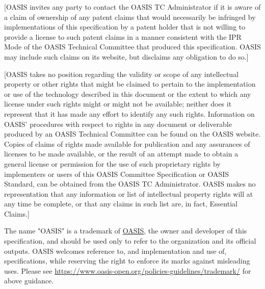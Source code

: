 \begin{titlepage}

[OASIS invites any party to contact the OASIS TC Administrator if it is
aware of a claim of ownership of any patent claims that would
necessarily be infringed by implementations of this specification by a
patent holder that is not willing to provide a license to such patent
claims in a manner consistent with the IPR Mode of the OASIS Technical
Committee that produced this specification. OASIS may include such
claims on its website, but disclaims any obligation to do so.]

[OASIS takes no position regarding the validity or scope of any
intellectual property or other rights that might be claimed to pertain
to the implementation or use of the technology described in this
document or the extent to which any license under such rights might or
might not be available; neither does it represent that it has made any
effort to identify any such rights. Information on OASIS' procedures
with respect to rights in any document or deliverable produced by an
OASIS Technical Committee can be found on the OASIS website. Copies of
claims of rights made available for publication and any assurances of
licenses to be made available, or the result of an attempt made to
obtain a general license or permission for the use of such proprietary
rights by implementers or users of this OASIS Committee Specification
or OASIS Standard, can be obtained from the OASIS TC Administrator.
OASIS makes no representation that any information or list of
intellectual property rights will at any time be complete, or that any
claims in such list are, in fact, Essential Claims.]

The name "OASIS" is a trademark of \href{https://www.oasis-open.org/}{OASIS}, the owner and developer of
this specification, and should be used only to refer to the
organization and its official outputs. OASIS welcomes reference to,
and implementation and use of, specifications, while reserving the
right to enforce its marks against misleading uses. Please see
\url{https://www.oasis-open.org/policies-guidelines/trademark/} for above guidance.
\\\\

\end{titlepage}
